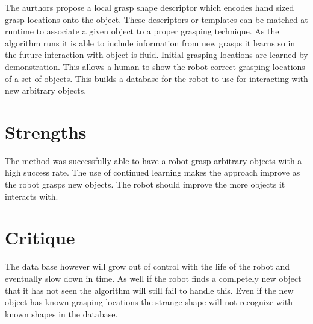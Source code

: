 \documentclass{article}
\begin{document}
The aurthors propose a local grasp shape descriptor which encodes hand sized grasp locations onto the object. These descriptors or templates can be matched at runtime to associate a given object to a proper grasping technique. As the algorithm runs it is able to include information from new grasps it learns so in the future interaction with object is fluid. Initial grasping locations are learned by demonstration. This allows a human to show the robot correct grasping locations of a set of objects. This builds a database for the robot to use for interacting with new arbitrary objects.
\section*{Strengths}
The method was successfully able to have a robot grasp arbitrary objects with a high success rate. The use of continued learning makes the approach improve as the robot grasps new objects. The robot should improve the more objects it interacts with.
\section*{Critique}
The data base however will grow out of control with the life of the robot and eventually slow down in time. As well if the robot finds a comlpetely new object that it has not seen the algorithm will still fail to handle this. Even if the new object has known grasping locations the strange shape will not recognize with known shapes in the database.
\cite{goossens93}
\end{document}
